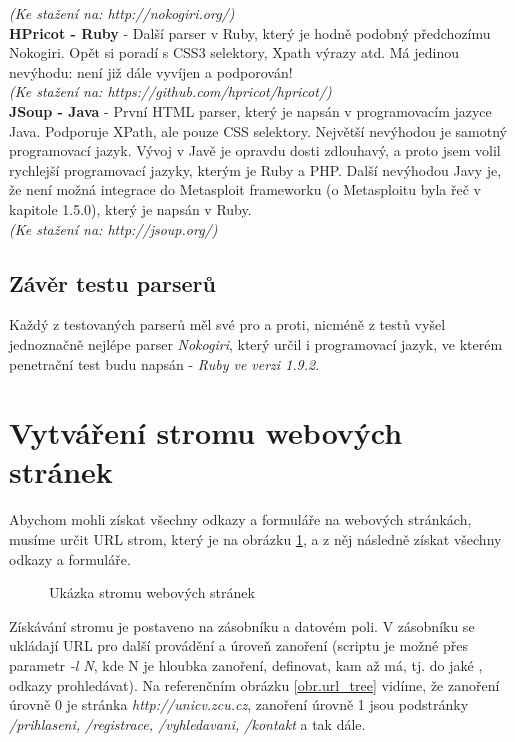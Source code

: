 \documentclass[12pt, a4paper]{report}
\begin{document}
\textit{(Ke stažení na: http://nokogiri.org/)}\\
\newline
\textbf{HPricot - Ruby} - Další parser v Ruby, který je hodně podobný předchozímu Nokogiri. Opět si poradí s CSS3 selektory, Xpath výrazy atd. Má jedinou nevýhodu: není již dále vyvíjen a podporován!\\
\textit{(Ke stažení na: https://github.com/hpricot/hpricot/)}\\
\newline
\textbf{JSoup - Java} - První HTML parser, který je napsán v programovacím jazyce Java. Podporuje XPath, ale pouze CSS selektory. Největší nevýhodou je samotný programovací jazyk. Vývoj v Javě je opravdu dosti zdlouhavý, a proto jsem volil rychlejší programovací jazyky, kterým je Ruby a PHP. Další nevýhodou Javy je, že není možná integrace do Metasploit frameworku (o Metasploitu byla řeč v kapitole 1.5.0), který je napsán v Ruby.\\
\textit{(Ke stažení na: http://jsoup.org/)}

\subsection{Závěr testu parserů}
Každý z testovaných parserů měl své pro a proti, nicméně z testů vyšel jednoznačně nejlépe parser \textit{Nokogiri}, který určil i programovací jazyk, ve kterém penetrační test budu napsán - \textit{Ruby ve verzi 1.9.2}. 

\section{Vytváření stromu webových stránek}
Abychom mohli získat všechny odkazy a formuláře na webových stránkách, musíme určit URL strom, který je na obrázku \ref{obr.url_stack}, a z něj následně získat všechny odkazy a formuláře.
\begin{figure}[h!]
\caption{Ukázka stromu webových stránek}
\label{obr.url_stack}
\end{figure}
Získávání stromu je postaveno na zásobníku a datovém poli. V zásobníku se ukládají URL pro další provádění a úroveň zanoření (scriptu je možné přes parametr \textit{-l N}, kde N je hloubka zanoření, definovat, kam až má, tj. do jaké , odkazy prohledávat). Na referenčním obrázku \ref{obr.url_tree} vidíme, že zanoření úrovně 0 je stránka \textit{http://unicv.zcu.cz}, zanoření úrovně 1 jsou podstránky \textit{/prihlaseni, /registrace, /vyhledavani, /kontakt} a tak dále.
\end{document}
